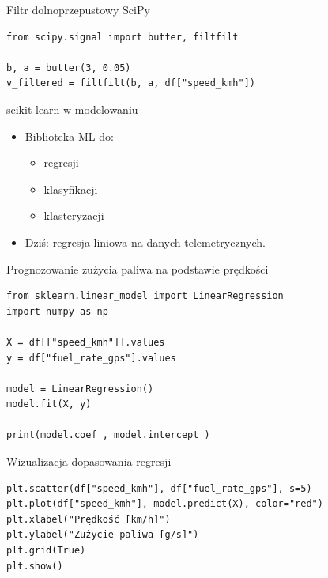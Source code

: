 \documentclass[aspectratio=169]{beamer}
\begin{document}
\begin{frame}[fragile]{Filtr dolnoprzepustowy SciPy}
\begin{verbatim}
from scipy.signal import butter, filtfilt

b, a = butter(3, 0.05)
v_filtered = filtfilt(b, a, df["speed_kmh"])
\end{verbatim}
\end{frame}

\begin{frame}{scikit-learn w modelowaniu}
  \begin{itemize}
    \item Biblioteka ML do:
      \begin{itemize}
        \item regresji
        \item klasyfikacji
        \item klasteryzacji
      \end{itemize}
    \item Dziś: regresja liniowa na danych telemetrycznych.
  \end{itemize}
\end{frame}

\begin{frame}[fragile]{Prognozowanie zużycia paliwa na podstawie prędkości}
\begin{verbatim}
from sklearn.linear_model import LinearRegression
import numpy as np

X = df[["speed_kmh"]].values
y = df["fuel_rate_gps"].values

model = LinearRegression()
model.fit(X, y)

print(model.coef_, model.intercept_)
\end{verbatim}
\end{frame}

\begin{frame}[fragile]{Wizualizacja dopasowania regresji}
\begin{verbatim}
plt.scatter(df["speed_kmh"], df["fuel_rate_gps"], s=5)
plt.plot(df["speed_kmh"], model.predict(X), color="red")
plt.xlabel("Prędkość [km/h]")
plt.ylabel("Zużycie paliwa [g/s]")
plt.grid(True)
plt.show()
\end{verbatim}
\end{frame}
\end{document}
